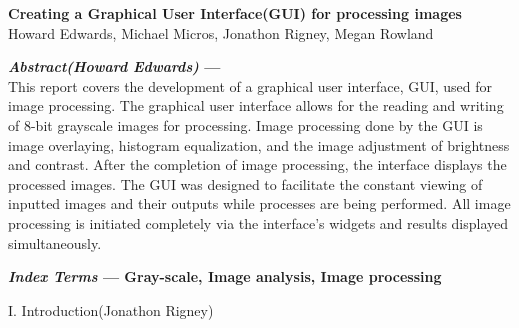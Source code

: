 \documentclass{article}
\begin{document}
\begin{center}

\vspace* {15 pt}
\Huge{\bf Creating  a Graphical User Interface(GUI) for processing images }\\
\vspace {20 pt}
\large{Howard Edwards, Michael Micros, Jonathon  Rigney, Megan Rowland \\}

\end{center}

\vspace{20 pt}




\begin{multicols*}{2}

{\bf  \textit {Abstract(Howard Edwards)} ---
}\\
     This report covers the development of a graphical user interface, GUI, used for image processing. The graphical user interface allows for the reading and writing of 8-bit grayscale images for processing. Image processing done by the GUI is image overlaying, histogram equalization, and the image adjustment of brightness and contrast. After the completion of image processing, the interface displays the processed images. The GUI was designed to facilitate the constant viewing of inputted images and their outputs while processes are being performed.  All image processing is initiated completely via the interface’s widgets and results displayed simultaneously. 


{\bf  \textit {Index Terms} --- Gray-scale, Image analysis, Image processing
}




\begin{center}
\large{I. Introduction(Jonathon Rigney)}
\end{center}


\end{multicols*}
\end{document}
